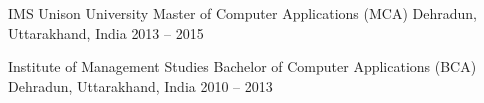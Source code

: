 

\begin{cventries}

  \cventry
    {IMS Unison University} %
    {Master of Computer Applications (MCA)} %
    {Dehradun, Uttarakhand, India} %
    {2013 -- 2015} %
    {}

  \cventry
    {Institute of Management Studies} %
    {Bachelor of Computer Applications (BCA)} %
    {Dehradun, Uttarakhand, India} %
    {2010 -- 2013} %
    {}

\end{cventries}